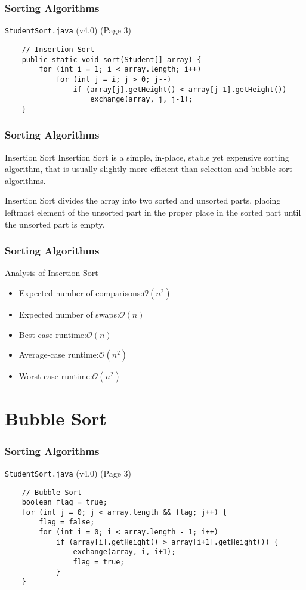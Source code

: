 \documentclass[10pt, compress]{beamer}
\begin{document}
\begin{frame}[fragile]
	\frametitle{Sorting Algorithms}
	\begin{block}{\texttt{StudentSort.java} (v4.0) (Page 3)}
		\begin{verbatim}
	// Insertion Sort
	public static void sort(Student[] array) {
		for (int i = 1; i < array.length; i++)
			for (int j = i; j > 0; j--)
				if (array[j].getHeight() < array[j-1].getHeight())
					exchange(array, j, j-1);
	}
		\end{verbatim}
	\end{block}
\end{frame}

\begin{frame}[fragile]
	\frametitle{Sorting Algorithms}
	\begin{block}{Insertion Sort}
		Insertion Sort is a simple, in-place, stable yet expensive sorting algorithm, that is usually slightly more efficient than selection and bubble sort algorithms.

		Insertion Sort divides the array into two sorted and unsorted parts, placing leftmost element of the unsorted part in the proper place in the sorted part until the unsorted part is empty.
	\end{block}
\end{frame}

\begin{frame}[fragile]
	\frametitle{Sorting Algorithms}
	\begin{block}{Analysis of Insertion Sort}
		\begin{itemize}
			\item[] Expected number of comparisons:\hfill $\mathcal{O}(n^2)$
			\item[] Expected number of swaps:\hfill $\mathcal{O}(n)$
			\item[] Best-case runtime:\hfill $\mathcal{O}(n)$
			\item[] Average-case runtime:\hfill $\mathcal{O}(n^2)$
			\item[] Worst case runtime:\hfill $\mathcal{O}(n^2)$
		\end{itemize}
	\end{block}
\end{frame}

\section{Bubble Sort}

\begin{frame}[fragile]
	\frametitle{Sorting Algorithms}
	\begin{block}{\texttt{StudentSort.java} (v4.0) (Page 3)}
		\begin{verbatim}
	// Bubble Sort
	boolean flag = true;
	for (int j = 0; j < array.length && flag; j++) {
		flag = false;
		for (int i = 0; i < array.length - 1; i++)
			if (array[i].getHeight() > array[i+1].getHeight()) {
				exchange(array, i, i+1);
				flag = true;
			}
	}
		\end{verbatim}
	\end{block}
\end{frame}
\end{document}
